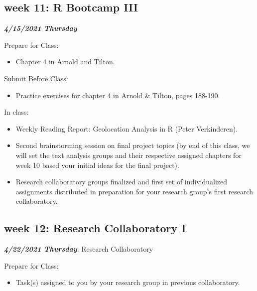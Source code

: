 \documentclass[
]{book}
\providecommand{\tightlist}{%
  \setlength{\itemsep}{0pt}\setlength{\parskip}{0pt}}
\begin{document}
\hypertarget{week-11-r-bootcamp-iii}{%
\subsection{week 11: R Bootcamp III}\label{week-11-r-bootcamp-iii}}

\textbf{\emph{4/15/2021 Thursday}}

Prepare for Class:

\begin{itemize}
\tightlist
\item
  Chapter 4 in Arnold and Tilton.
\end{itemize}

Submit Before Class:

\begin{itemize}
\tightlist
\item
  Practice exercises for chapter 4 in Arnold \& Tilton, pages 188-190.
\end{itemize}

In class:

\begin{itemize}
\tightlist
\item
  Weekly Reading Report: Geolocation Analysis in R (Peter Verkinderen).
\item
  Second brainstorming session on final project topics (by end of this class, we will set the text analysis groups and their respective assigned chapters for week 10 based your initial ideas for the final project).
\item
  Research collaboratory groups finalized and first set of individualized assignments distributed in preparation for your research group's first research collaboratory.
\end{itemize}

\hypertarget{week-12-research-collaboratory-i}{%
\subsection{week 12: Research Collaboratory I}\label{week-12-research-collaboratory-i}}

\textbf{\emph{4/22/2021 Thursday}}: Research Collaboratory

Prepare for Class:

\begin{itemize}
\tightlist
\item
  Task(s) assigned to you by your research group in previous collaboratory.
\end{itemize}
\end{document}
